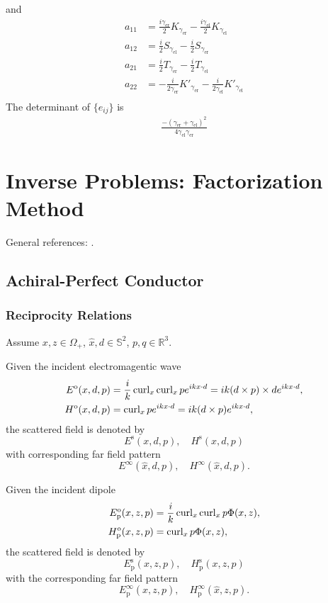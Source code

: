 and 
\begin{align*}
  a_{11} &= \frac{i\gamma_\text{er}}{2}K_{\gamma_\text{er}}-\frac{i\gamma_\text{el}}{2}K_{\gamma_\text{el}}\\
  a_{12} &= \frac{i}{2}S_{\gamma_\text{el}}-\frac{i}{2}S_{\gamma_\text{er}}\\
  a_{21} &= \frac{i}{2}T_{\gamma_\text{er}}-\frac{i}{2}T_{\gamma_\text{el}}\\
  a_{22} &= -\frac{i}{2\gamma_\text{er}}K'_{\gamma_\text{er}} - \frac{i}{2 \gamma_\text{el}} K'_{\gamma_\text{el}} \\
\end{align*}
The determinant of $\{e_{ij}\}$ is 
\begin{align*}
  \frac{-(\gamma_\text{er}+\gamma_\text{el})^2}{4 \gamma_\text{el} \gamma_\text{er}}
\end{align*}


\chapter{Inverse Problems: Factorization Method}

General references: \citet{cessenat,colton3,nedelec,mitrea97}.

\section{Achiral-Perfect Conductor}

\subsection{Reciprocity Relations}

Assume $x, z\in\Omega_+$, $\hat{x}, d\in\mathbb{S}^2$, $p, q\in\mathbb{R}^3$.  

Given the incident electromagentic wave 
\begin{align*}
  E^\text{o}(x, d, p) &= \frac{i}{k}\operatorname{curl}_x\operatorname{curl}_x p e^{ikx\cdot d} = ik(d\times p)\times d e^{ikx\cdot d}, \\
  H^\text{o}(x, d, p) &= \operatorname{curl}_x p e^{ikx\cdot d} = ik(d\times p)e^{ikx\cdot d}, 
\end{align*} 
the scattered field is denoted by 
$$E^\text{s}(x, d, p),\quad H^\text{s}(x, d, p)$$
with corresponding far field pattern
$$E^\infty(\hat{x}, d, p), \quad H^\infty(\hat{x}, d, p).$$

Given the incident dipole 
\begin{align*}
  E_\text{p}^\text{o}(x, z, p) &= \frac{i}{k}\operatorname{curl}_x\operatorname{curl}_x p\Phi(x, z), \\
  H_\text{p}^\text{o}(x, z, p) &= \operatorname{curl}_x p\Phi(x, z),
\end{align*}
the scattered field is denoted by 
$$E_\text{p}^\text{s}(x, z, p),\quad H_\text{p}^\text{s}(x, z, p)$$ 
with the corresponding far field pattern
$$E_\text{p}^\infty(\hat{x}, z, p),\quad H_\text{p}^\infty(\hat{x}, z, p).$$

